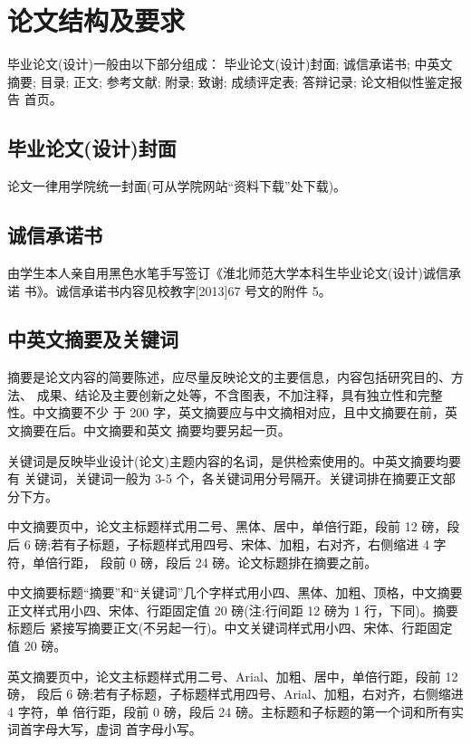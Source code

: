 \chapter{论文结构及要求}
毕业论文(设计)一般由以下部分组成：\cite{1}
\subitem 毕业论文(设计)封面;
\subitem 诚信承诺书;
\subitem 中英文摘要;
\subitem 目录;
\subitem 正文;
\subitem 参考文献;
\subitem 附录;
\subitem 致谢;
\subitem 成绩评定表;
\subitem 答辩记录;
\subitem 论文相似性鉴定报告 首页。
\section{毕业论文(设计)封面}

论文一律用学院统一封面(可从学院网站“资料下载”处下载)。

\section{诚信承诺书}

由学生本人亲自用黑色水笔手写签订《淮北师范大学本科生毕业论文(设计)诚信承诺 书》。诚信承诺书内容见校教字[2013]67 号文的附件 5。

\section{中英文摘要及关键词}

摘要是论文内容的简要陈述，应尽量反映论文的主要信息，内容包括研究目的、方法、 成果、结论及主要创新之处等，不含图表，不加注释，具有独立性和完整性。中文摘要不少 于 200 字，英文摘要应与中文摘相对应，且中文摘要在前，英文摘要在后。中文摘要和英文 摘要均要另起一页。

关键词是反映毕业设计(论文)主题内容的名词，是供检索使用的。中英文摘要均要有 关键词，关键词一般为 3-5 个，各关键词用分号隔开。关键词排在摘要正文部分下方。

中文摘要页中，论文主标题样式用二号、黑体、居中，单倍行距，段前 12 磅，段后 6 磅;若有子标题，子标题样式用四号、宋体、加粗，右对齐，右侧缩进 4 字符，单倍行距， 段前 0 磅，段后 24 磅。论文标题排在摘要之前。

中文摘要标题“摘要”和“关键词”几个字样式用小四、黑体、加粗、顶格，中文摘要 正文样式用小四、宋体、行距固定值 20 磅(注:行间距 12 磅为 1 行，下同)。摘要标题后 紧接写摘要正文(不另起一行)。中文关键词样式用小四、宋体、行距固定值 20 磅。

英文摘要页中，论文主标题样式用二号、Arial、加粗、居中，单倍行距，段前 12 磅， 段后 6 磅;若有子标题，子标题样式用四号、Arial、加粗，右对齐，右侧缩进 4 字符，单 倍行距，段前 0 磅，段后 24 磅。主标题和子标题的第一个词和所有实词首字母大写，虚词 首字母小写。

